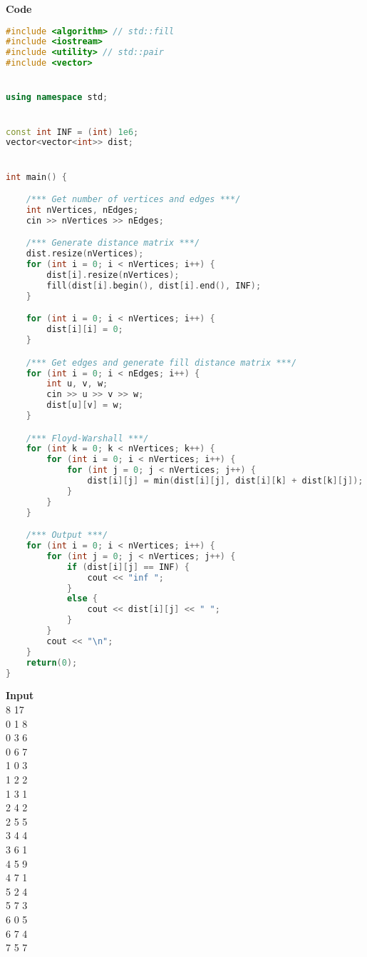 \documentclass[10pt]{article}
\begin{document}
\textbf{Code} \\

\begin{lstlisting}[language=C++]
#include <algorithm> // std::fill
#include <iostream>
#include <utility> // std::pair
#include <vector>


using namespace std;


const int INF = (int) 1e6;
vector<vector<int>> dist;


int main() {

    /*** Get number of vertices and edges ***/
    int nVertices, nEdges;
    cin >> nVertices >> nEdges;

    /*** Generate distance matrix ***/
    dist.resize(nVertices);
    for (int i = 0; i < nVertices; i++) {
        dist[i].resize(nVertices);
        fill(dist[i].begin(), dist[i].end(), INF);
    }

    for (int i = 0; i < nVertices; i++) {
        dist[i][i] = 0;
    }

    /*** Get edges and generate fill distance matrix ***/
    for (int i = 0; i < nEdges; i++) {
        int u, v, w;
        cin >> u >> v >> w;
        dist[u][v] = w;
    }

    /*** Floyd-Warshall ***/
    for (int k = 0; k < nVertices; k++) {
        for (int i = 0; i < nVertices; i++) {
            for (int j = 0; j < nVertices; j++) {
                dist[i][j] = min(dist[i][j], dist[i][k] + dist[k][j]);
            }
        }
    }

    /*** Output ***/
    for (int i = 0; i < nVertices; i++) {
        for (int j = 0; j < nVertices; j++) {
            if (dist[i][j] == INF) {
                cout << "inf ";
            }
            else {
                cout << dist[i][j] << " ";
            }
        }
        cout << "\n";
    }
    return(0);
}
\end{lstlisting}

\textbf{Input} \\
8 17 \\
0 1 8 \\
0 3 6 \\
0 6 7 \\
1 0 3 \\
1 2 2 \\
1 3 1 \\
2 4 2 \\
2 5 5 \\
3 4 4 \\
3 6 1 \\
4 5 9 \\
4 7 1 \\
5 2 4 \\
5 7 3 \\
6 0 5 \\
6 7 4 \\
7 5 7 \\
\end{document}
